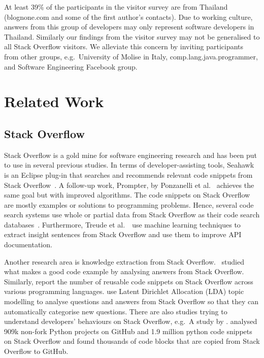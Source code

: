 \documentclass{svjour3}                     %
\begin{document}
At least 39\% of the participants in the visitor survey are from Thailand
(\textsf{blognone.com} and some of the first author's contacts). Due to working
culture, answers from this group of developers may only represent software
developers in Thailand. Similarly our findings from the visitor survey may not
be generalised to all Stack Overflow visitors. We alleviate this concern by
inviting participants from other groups, e.g.~University of Molise in Italy,
comp.lang.java.programmer, and Software Engineering Facebook group.

\section{Related Work}

\subsection{Stack Overflow}

Stack Overflow is a gold mine for software engineering research and has been put
to use in several previous studies. In terms of developer-assisting tools,
Seahawk is an Eclipse plug-in that searches and recommends relevant code
snippets from Stack Overflow~\citep{Ponzanelli2013}. A follow-up work, Prompter,
by Ponzanelli et al.~\citep{Ponzanelli2014} achieves the same goal but with
improved algorithms. The code snippets on Stack Overflow are mostly examples or
solutions to programming problems. Hence, several code search systems use whole
or partial data from Stack Overflow as their code search
databases~\citep{Keivanloo2014,Park2014,
	Stolee2014,Subramanian2013,Diamantopoulos2015}. Furthermore, Treude et
al.~\cite{Treude2016}~use machine learning techniques to extract insight
sentences from Stack Overflow and use them to improve API documentation.

Another research area is knowledge extraction from Stack Overflow.
\cite{Nasehi2012}~studied what makes a good code example by analysing answers
from Stack Overflow. Similarly, \cite{Yang2016} report the number of reusable
code snippets on Stack Overflow across various programming languages.
\cite{Wang2013_StackOverflow} use Latent Dirichlet Allocation (LDA) topic
modelling to analyse questions and answers from Stack Overflow so that they can
automatically categorise new questions. There are also studies trying to
understand developers' behaviours on Stack Overflow, e.g.~A study by
\cite{Movshovitz-Attias2013,Rosen2016,Choetkiertikul2015,Bosu2013}.
\cite{Yang2017} analysed 909k non-fork Python projects on GitHub and 1.9 million
python code snippets on Stack Overflow and found thousands of code blocks that
are copied from Stack Overflow to GitHub.
\end{document}
